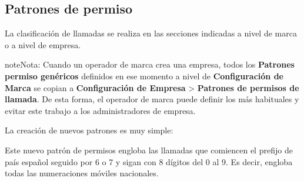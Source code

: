 \documentclass[letterpaper,10pt,spanish]{sphinxmanual}
\begin{document}
\subsection{Patrones de permiso}
\label{pbx_features/call_permissions:call-acl-patterns}
La clasificación de llamadas se realiza en las secciones indicadas a nivel de marca o a nivel de empresa.

\begin{notice}{note}{Nota:}
Cuando un operador de marca crea una empresa, todos los \textbf{Patrones permiso genéricos} definidos en ese momento a nivel de \textbf{Configuración de Marca} se copian a \textbf{Configuración de Empresa} \textgreater{} \textbf{Patrones de permisos de llamada}. De esta forma, el operador de marca puede definir los más habituales y evitar este trabajo a los administradores de empresa.
\end{notice}

La creación de nuevos patrones es muy simple:

\noindent{}

Este nuevo patrón de permisos engloba las llamadas que comiencen el prefijo de país español seguido por 6 o 7 y sigan con 8 dígitos del 0 al 9. Es decir, engloba todas las numeraciones móviles nacionales.
\end{document}
